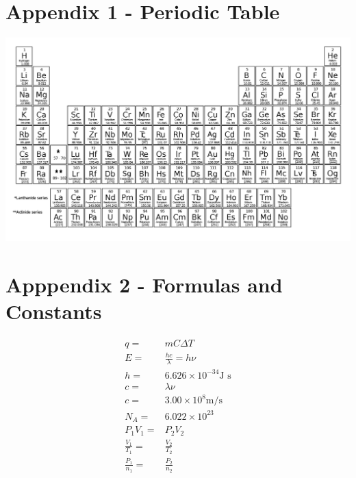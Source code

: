 \documentclass[12pt]{exam}		%
\begin{document}
\newpage

\appendix

\section{Appendix 1 - Periodic Table}

\begin{center}
  \includegraphics[scale=0.24,angle=90]{periodic_table}
\end{center}

\section{Apppendix 2 - Formulas and Constants}

\begin{align*}
  q = & mC\Delta T \\
  E = & \frac{hc}{\lambda} = h\nu \\
  h = & 6.626 \times 10^{-34} \text{J s} \\
  c = & \lambda \nu \\
  c = & 3.00 \times 10^8 \text{m/s} \\
  N_A = & 6.022\times 10^{23} \\
  P_1V_1 = & P_2V_2 \\
  \frac{V_1}{T_1} = & \frac{V_2}{T_2} \\
  \frac{P_1}{n_1} = & \frac{P_2}{n_2}
\end{align*}
\end{document}
